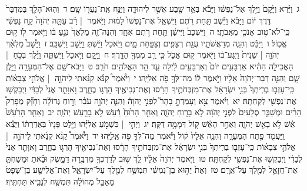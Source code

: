 \documentclass[18pt]{article}
\newcommand{\kri}[1]{\Afootnote{#1}}	%
\begin{document}
 {\loc ג~}וַיַּ֗רְא וַיָּ֙קׇם֙ וַיֵּ֣לֶךְ אֶל־נַפְשׁ֔וֹ וַיָּבֹ֕א בְּאֵ֥ר שֶׁ֖בַע אֲשֶׁ֣ר לִיהוּדָ֑ה וַיַּנַּ֥ח אֶֽת־נַעֲר֖וֹ שָֽׁם׃ \startlock
 {\loc ד~}וְהֽוּא־הָלַ֤ךְ בַּמִּדְבָּר֙ דֶּ֣רֶךְ י֔וֹם וַיָּבֹ֕א וַיֵּ֕שֶׁב תַּ֖חַת רֹ֣תֶם  \edtext{(אחת)}{\kri{קרי: אֶחָ֑ד}}  וַיִּשְׁאַ֤ל אֶת־נַפְשׁוֹ֙ לָמ֔וּת וַיֹּ֣אמֶר  |  רַ֗ב עַתָּ֤ה יְהֹוָה֙ קַ֣ח נַפְשִׁ֔י כִּֽי־לֹא־ט֥וֹב אָנֹכִ֖י מֵאֲבֹתָֽי׃ \startlock
 {\loc ה~}וַיִּשְׁכַּב֙ וַיִּישַׁ֔ן תַּ֖חַת רֹ֣תֶם אֶחָ֑ד וְהִנֵּה־זֶ֤ה מַלְאָךְ֙ נֹגֵ֣עַ בּ֔וֹ וַיֹּ֥אמֶר ל֖וֹ ק֥וּם אֱכֽוֹל׃ \startlock
 {\loc ו~}וַיַּבֵּ֕ט וְהִנֵּ֧ה מְרַאֲשֹׁתָ֛יו עֻגַ֥ת רְצָפִ֖ים וְצַפַּ֣חַת מָ֑יִם וַיֹּ֣אכַל וַיֵּ֔שְׁתְּ וַיָּ֖שׇׁב וַיִּשְׁכָּֽב׃ \startlock
 {\loc ז~}וַיָּ֩שׇׁב֩ מַלְאַ֨ךְ יְהֹוָ֤ה  |  שֵׁנִית֙ וַיִּגַּע־בּ֔וֹ וַיֹּ֖אמֶר ק֣וּם אֱכֹ֑ל כִּ֛י רַ֥ב מִמְּךָ֖ הַדָּֽרֶךְ׃ \startlock
 {\loc ח~}וַיָּ֖קׇם וַיֹּ֣אכַל וַיִּשְׁתֶּ֑ה וַיֵּ֜לֶךְ בְּכֹ֣חַ  |  הָאֲכִילָ֣ה הַהִ֗יא אַרְבָּעִ֥ים יוֹם֙ וְאַרְבָּעִ֣ים לַ֔יְלָה עַ֛ד הַ֥ר הָאֱלֹהִ֖ים חֹרֵֽב׃ \startlock
 {\loc ט~}וַיָּבֹא־שָׁ֥ם אֶל־הַמְּעָרָ֖ה וַיָּ֣לֶן שָׁ֑ם וְהִנֵּ֤ה דְבַר־יְהֹוָה֙ אֵלָ֔יו וַיֹּ֣אמֶר ל֔וֹ מַה־לְּךָ֥ פֹ֖ה אֵלִיָּֽהוּ׃ \startlock
 {\loc י~}וַיֹּ֩אמֶר֩ קַנֹּ֨א קִנֵּ֜אתִי לַיהֹוָ֣ה  |  אֱלֹהֵ֣י צְבָא֗וֹת כִּֽי־עָזְב֤וּ בְרִֽיתְךָ֙ בְּנֵ֣י יִשְׂרָאֵ֔ל אֶת־מִזְבְּחֹתֶ֣יךָ הָרָ֔סוּ וְאֶת־נְבִיאֶ֖יךָ הָרְג֣וּ בֶחָ֑רֶב וָאִוָּתֵ֤ר אֲנִי֙ לְבַדִּ֔י וַיְבַקְשׁ֥וּ אֶת־נַפְשִׁ֖י לְקַחְתָּֽהּ׃ \startlock
 {\loc יא~}וַיֹּ֗אמֶר צֵ֣א וְעָמַדְתָּ֣ בָהָר֮ לִפְנֵ֣י יְהֹוָה֒ וְהִנֵּ֧ה יְהֹוָ֣ה עֹבֵ֗ר וְר֣וּחַ גְּדוֹלָ֡ה וְחָזָ֞ק מְפָרֵק֩ הָרִ֨ים וּמְשַׁבֵּ֤ר סְלָעִים֙ לִפְנֵ֣י יְהֹוָ֔ה לֹ֥א בָר֖וּחַ יְהֹוָ֑ה וְאַחַ֤ר הָר֙וּחַ֙ רַ֔עַשׁ לֹ֥א בָרַ֖עַשׁ יְהֹוָֽה׃ \startlock
 {\loc יב~}וְאַחַ֤ר הָרַ֙עַשׁ֙ אֵ֔שׁ לֹ֥א בָאֵ֖שׁ יְהֹוָ֑ה וְאַחַ֣ר הָאֵ֔שׁ ק֖וֹל דְּמָמָ֥ה דַקָּֽה׃ \startlock
 {\loc יג~}וַיְהִ֣י  |  כִּשְׁמֹ֣עַ אֵלִיָּ֗הוּ וַיָּ֤לֶט פָּנָיו֙ בְּאַדַּרְתּ֔וֹ וַיֵּצֵ֕א וַֽיַּעֲמֹ֖ד פֶּ֣תַח הַמְּעָרָ֑ה וְהִנֵּ֤ה אֵלָיו֙ ק֔וֹל וַיֹּ֕אמֶר מַה־לְּךָ֥ פֹ֖ה אֵֽלִיָּֽהוּ׃ \startlock
 {\loc יד~}וַיֹּ֩אמֶר֩ קַנֹּ֨א קִנֵּ֜אתִי לַיהֹוָ֣ה  |  אֱלֹהֵ֣י צְבָא֗וֹת כִּֽי־עָזְב֤וּ בְרִֽיתְךָ֙ בְּנֵ֣י יִשְׂרָאֵ֔ל אֶת־מִזְבְּחֹתֶ֣יךָ הָרָ֔סוּ וְאֶת־נְבִיאֶ֖יךָ הָרְג֣וּ בֶחָ֑רֶב וָאִוָּתֵ֤ר אֲנִי֙ לְבַדִּ֔י וַיְבַקְשׁ֥וּ אֶת־נַפְשִׁ֖י לְקַחְתָּֽהּ׃ \startlock
 {\loc טו~}וַיֹּ֤אמֶר יְהֹוָה֙ אֵלָ֔יו לֵ֛ךְ שׁ֥וּב לְדַרְכְּךָ֖ מִדְבַּ֣רָה דַמָּ֑שֶׂק וּבָ֗אתָ וּמָשַׁחְתָּ֧ אֶת־חֲזָאֵ֛ל לְמֶ֖לֶךְ עַל־אֲרָֽם׃ \startlock
 {\loc טז~}וְאֵת֙ יֵה֣וּא בֶן־נִמְשִׁ֔י תִּמְשַׁ֥ח לְמֶ֖לֶךְ עַל־יִשְׂרָאֵ֑ל וְאֶת־אֱלִישָׁ֤ע בֶּן־שָׁפָט֙ מֵאָבֵ֣ל מְחוֹלָ֔ה תִּמְשַׁ֥ח לְנָבִ֖יא תַּחְתֶּֽיךָ׃ \startlock
\end{document}
